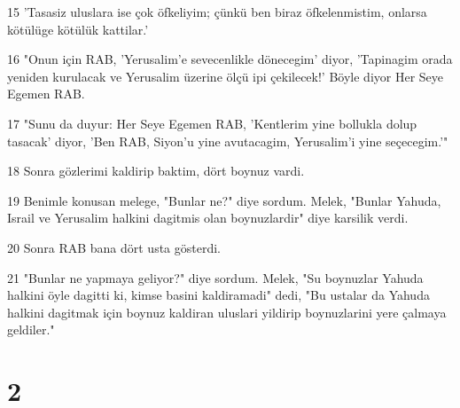 \par 15 'Tasasiz uluslara ise çok öfkeliyim; çünkü ben biraz öfkelenmistim, onlarsa kötülüge kötülük kattilar.'
\par 16 "Onun için RAB, 'Yerusalim'e sevecenlikle dönecegim' diyor, 'Tapinagim orada yeniden kurulacak ve Yerusalim üzerine ölçü ipi çekilecek!' Böyle diyor Her Seye Egemen RAB.
\par 17 "Sunu da duyur: Her Seye Egemen RAB, 'Kentlerim yine bollukla dolup tasacak' diyor, 'Ben RAB, Siyon'u yine avutacagim, Yerusalim'i yine seçecegim.'"
\par 18 Sonra gözlerimi kaldirip baktim, dört boynuz vardi.
\par 19 Benimle konusan melege, "Bunlar ne?" diye sordum. Melek, "Bunlar Yahuda, Israil ve Yerusalim halkini dagitmis olan boynuzlardir" diye karsilik verdi.
\par 20 Sonra RAB bana dört usta gösterdi.
\par 21 "Bunlar ne yapmaya geliyor?" diye sordum. Melek, "Su boynuzlar Yahuda halkini öyle dagitti ki, kimse basini kaldiramadi" dedi, "Bu ustalar da Yahuda halkini dagitmak için boynuz kaldiran uluslari yildirip boynuzlarini yere çalmaya geldiler."

\chapter{2}

